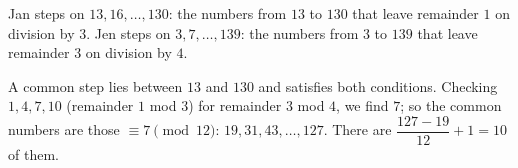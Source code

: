 Jan steps on $13,16,\ldots,130$: the numbers from $13$ to $130$ that leave remainder $1$ on division by $3$. Jen steps on $3,7,\ldots,139$: the numbers from $3$ to $139$ that leave remainder $3$ on division by $4$.

A common step lies between $13$ and $130$ and satisfies both conditions. Checking $1,4,7,10$ (remainder $1$ mod $3$) for remainder $3$ mod $4$, we find $7$; so the common numbers are those $\equiv7\pmod{12}$: $19,31,43,\ldots,127$. There are $\dfrac{127-19}{12}+1=\boxed{10}$ of them.
